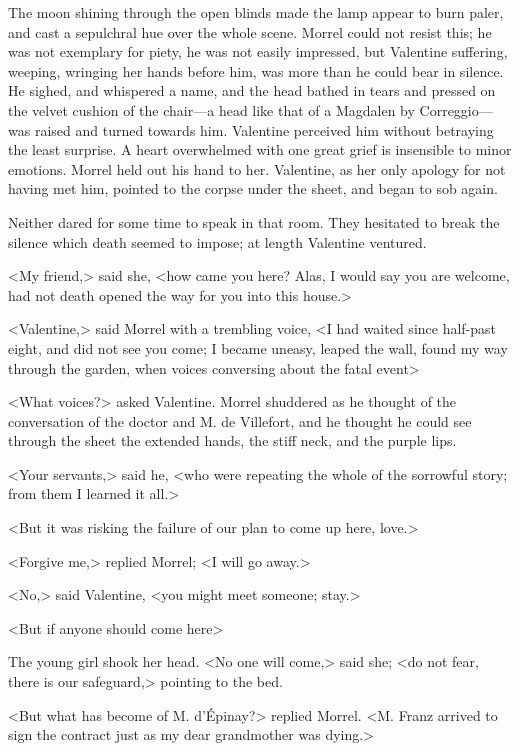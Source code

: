  The moon shining through the open blinds made the lamp appear to burn paler, and cast a sepulchral hue over the whole scene. Morrel could not resist this; he was not exemplary for piety, he was not easily impressed, but Valentine suffering, weeping, wringing her hands before him, was more than he could bear in silence. He sighed, and whispered a name, and the head bathed in tears and pressed on the velvet cushion of the chair—a head like that of a Magdalen by Correggio—was raised and turned towards him. Valentine perceived him without betraying the least surprise. A heart overwhelmed with one great grief is insensible to minor emotions. Morrel held out his hand to her. Valentine, as her only apology for not having met him, pointed to the corpse under the sheet, and began to sob again. 

 Neither dared for some time to speak in that room. They hesitated to break the silence which death seemed to impose; at length Valentine ventured. 

 <My friend,> said she, <how came you here? Alas, I would say you are welcome, had not death opened the way for you into this house.> 

 <Valentine,> said Morrel with a trembling voice, <I had waited since half-past eight, and did not see you come; I became uneasy, leaped the wall, found my way through the garden, when voices conversing about the fatal event\longdash> 

 <What voices?> asked Valentine. Morrel shuddered as he thought of the conversation of the doctor and M. de Villefort, and he thought he could see through the sheet the extended hands, the stiff neck, and the purple lips. 

 <Your servants,> said he, <who were repeating the whole of the sorrowful story; from them I learned it all.> 

 <But it was risking the failure of our plan to come up here, love.> 

 <Forgive me,> replied Morrel; <I will go away.> 

 <No,> said Valentine, <you might meet someone; stay.> 

 <But if anyone should come here\longdash> 

 The young girl shook her head. <No one will come,> said she; <do not fear, there is our safeguard,> pointing to the bed. 

 <But what has become of M. d'Épinay?> replied Morrel.  <M. Franz arrived to sign the contract just as my dear grandmother was dying.> 

